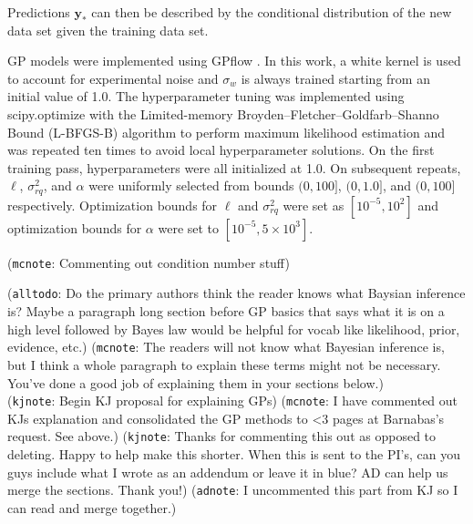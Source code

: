 \documentclass[journal=jacsat,manuscript=article]{achemso}
\newcommand{\kjnote}[1]{{\color{Blue} (\texttt{kjnote}: #1)}}
\newcommand{\alltodo}[1]{{\color{Cyan} (\texttt{alltodo}: #1)}}
\newcommand{\xvec}{\ensuremath{\mathbf{x}}}
\newcommand{\adnote}[1]{{\color{OliveGreen} (\texttt{adnote}: #1)}}
\newcommand{\mcnote}[1]{{\color{Plum} (\texttt{mcnote}: #1)}}
\begin{document}
\noindent Predictions $\mathbf{y}_*$ can then be described by the conditional distribution of the new data set given the training data set.


GP models were implemented using GPflow \cite{Matthews2017GPflow:TensorFlow}. In this work, a white kernel is used to account for experimental noise and $\sigma_w$ is always trained starting from an initial value of 1.0. The hyperparameter tuning was implemented using scipy.optimize \cite{Virtanen2020SciPyPython} with the Limited-memory Broyden–Fletcher–Goldfarb–Shanno Bound (L-BFGS-B) algorithm to perform maximum likelihood estimation and was repeated ten times to avoid local hyperparameter solutions. On the first training pass, hyperparameters were all initialized at 1.0. On subsequent repeats, $\ell$, $\sigma^2_{rq}$, and $\alpha$ were uniformly selected from bounds $(0, 100]$, $(0, 1.0]$, and $(0, 100]$  respectively. Optimization bounds for $\ell$ and $\sigma^2_{rq}$ were set as $[10^{-5}, 10^2]$ and optimization bounds for $\alpha$ were set to $[10^{-5}, 5\times 10^3]$.

\mcnote{Commenting out condition number stuff}

\alltodo{Do the primary authors think the reader knows what Baysian inference is? Maybe a paragraph long section before GP basics that says what it is on a high level followed by Bayes law would be helpful for vocab like likelihood, prior, evidence, etc.}
\mcnote{The readers will not know what Bayesian inference is, but I think a whole paragraph to explain these terms might not be necessary. You've done a good job of explaining them in your sections below.}
\\
\kjnote{Begin KJ proposal for explaining GPs}
\mcnote{I have commented out KJs explanation and consolidated the GP methods to <3 pages at Barnabas's request. See above.}
\kjnote{Thanks for commenting this out as opposed to deleting. Happy to help make this shorter. When this is sent to the PI's, can you guys include what I wrote as an addendum or leave it in blue? AD can help us merge the sections. Thank you!}
\adnote{I uncommented this part from KJ so I can read and merge together.}
\end{document}
